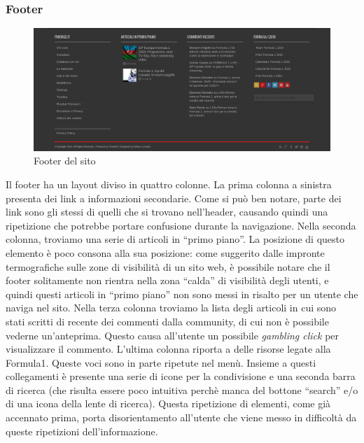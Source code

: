 \subsubsection{Footer}


\begin{figure}[H]
  \centering
  \includegraphics[scale=0.25]{footer}
  \caption{Footer del sito}
\end{figure}
Il footer ha un layout diviso in quattro colonne. La prima colonna a sinistra
presenta dei link a informazioni secondarie. Come si può ben notare, parte dei
link sono gli stessi di quelli che si trovano nell'header, causando quindi una
ripetizione che potrebbe portare confusione durante la navigazione.
Nella seconda colonna, troviamo una serie di articoli in ``primo piano''. La
posizione di questo elemento è poco consona alla sua posizione: come suggerito
dalle impronte termografiche sulle zone di visibilità di un
sito web, è possibile notare che il footer solitamente non rientra nella zona
``calda'' di visibilità degli utenti, e quindi questi articoli in ``primo piano''
non sono messi in risalto per un utente che naviga nel sito.
Nella terza colonna troviamo la lista degli articoli in cui sono stati scritti
di recente dei commenti dalla community, di cui non è possibile vederne
un'anteprima. Questo causa all'utente un possibile \textit{gambling click}
per visualizzare il commento.
L'ultima colonna riporta a delle risorse legate alla Formula1. Queste voci sono
in parte ripetute nel menù. Insieme a questi collegamenti è presente una serie
di icone per la condivisione e una seconda barra di ricerca (che risulta essere
poco intuitiva perchè manca del bottone ``search'' e/o di una icona della lente
di ricerca). Questa ripetizione di elementi, come già accennato prima, porta
disorientamento all'utente che viene messo in difficoltà da queste ripetizioni
dell'informazione.

